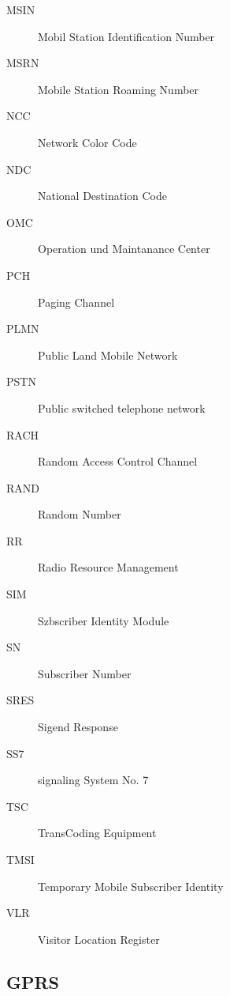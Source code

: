 \documentclass[10pt,a4paper]{scrartcl}
\begin{document}
\begin{description}
	\item[MSIN] Mobil Station Identification Number
	\item[MSRN] Mobile Station Roaming Number
	\item[NCC] Network Color Code
	\item[NDC] National Destination Code
	\item[OMC] Operation und Maintanance Center
	\item[PCH] Paging Channel
	\item[PLMN] Public Land Mobile Network
	\item[PSTN] Public switched telephone network
	\item[RACH] Random Access Control Channel
	\item[RAND] Random Number
	\item[RR] Radio Resource Management
	\item[SIM] Szbscriber Identity Module
	\item[SN] Subscriber Number
	\item[SRES] Sigend Response
	\item[SS7] signaling System No. 7
	\item[TSC] TransCoding Equipment 
	\item[TMSI] Temporary Mobile Subscriber Identity
	\item[VLR] Visitor Location Register
\end{description}
\subsection{GPRS}
\end{document}
